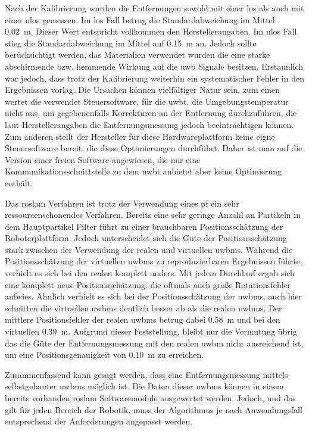Nach der Kalibrierung wurden die Entfernungen sowohl mit einer \gls{los} als auch mit einer \gls{nlos} gemessen. Im \gls{los} Fall betrug die Standardabweichung im Mittel \SI{0.02}{\meter}. Dieser Wert entspricht vollkommen den Herstellerangaben. Im \gls{nlos} Fall stieg die Standardabweichung im Mittel auf \SI{0.15}{\meter} an. Jedoch sollte berücksichtigt werden, das Materialien verwendet wurden die eine starke abschirmende bzw. hemmende Wirkung auf die \gls{uwb} Signale besitzen. Erstaunlich war jedoch, dass trotz der Kalibrierung weiterhin ein systematischer Fehler in den Ergebnissen vorlag. Die Ursachen können vielfältiger Natur sein, zum einen wertet die verwendet Steuersoftware, für die \gls{uwbt}, die Umgebungstemperatur nicht aus, um gegebenenfalls Korrekturen an der Entfernung durchzuführen, die laut Herstellerangaben die Entfernungsmessung jedoch beeinträchtigen können. Zum anderen stellt der Hersteller für diese Hardwareplattform keine eigne Steuersoftware bereit, die diese Optimierungen durchführt. Daher ist man auf die Version einer freien Software angewiesen, die nur eine Kommunikationsschnittstelle zu dem \gls{uwbt} anbietet aber keine Optimierung enthält.

Das \gls{roslam} Verfahren ist trotz der Verwendung eines \gls{pf} ein sehr ressourcenschonendes Verfahren. Bereits eine sehr geringe Anzahl an Partikeln in dem Hauptpartikel Filter führt zu einer brauchbaren Positionsschätzung der Roboterplattform. Jedoch unterscheidet sich die Güte der Positionsschätzung stark zwischen der Verwendung der realen und virtuellen \glspl{uwbm}. Während die Positionsschätzung der virtuellen \glspl{uwbm} zu reproduzierbaren Ergebnissen führte, verhielt es sich bei den realen  komplett anders. Mit jedem Durchlauf ergab sich eine komplett neue Positionsschätzung, die oftmals auch große Rotationsfehler aufwies. Ähnlich verhielt es sich bei der Positionsschätzung der \glspl{uwbm}, auch hier schnitten die virtuellen \glspl{uwbm} deutlich besser ab als die realen \glspl{uwbm}. Der mittlere Positionsfehler der realen \glspl{uwbm} betrug dabei \SI{0.58}{\meter} und bei den virtuellen \SI{0.39}{\meter}. Aufgrund dieser Feststellung, bleibt nur die Vermutung übrig das die Güte der Entfernungsmessung mit den realen \gls{uwbm} nicht ausreichend ist, um eine Positionsgenauigkeit von \SI{0.10}{\meter} zu erreichen.

Zusammenfassend kann gesagt werden, dass eine Entfernungsmessung mittels selbstgebauter \glspl{uwbm} möglich ist. Die Daten dieser \glspl{uwbm} können in einem bereits vorhanden \gls{roslam} Softwaremodule ausgewertet werden. Jedoch, und das gilt für jeden Bereich der Robotik, muss der Algorithmus je nach Anwendungsfall entsprechend der Anforderungen angepasst werden.

